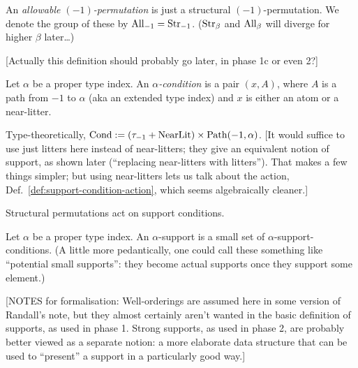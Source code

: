 \begin{definition}
  \label{def:allowable-perm-atoms}
  An \emph{allowable $(-1)$-permutation} is just a structural $(-1)$-permutation. We denote the group of these by $\mathrm{All}_{-1} = \mathrm{Str}_{-1}$.  ($\mathrm{Str}_\beta$ and $\mathrm{All}_\beta$ will diverge for higher $\beta$ later…)

  [Actually this definition should probably go later, in phase 1c or even 2?]
\end{definition}

\begin{definition}
  \label{def:support-condition}
  \leanok
  Let $\alpha$ be a proper type index. An \emph{$\alpha$-condition} is a pair $(x,A)$, where $A$ is a path from $-1$ to $\alpha$ (aka an extended type index) and $x$ is either an atom or a near-litter.

  Type-theoretically, $\mathrm{Cond} := (\tau_{-1} + \mathrm{NearLit}) \times \mathrm{Path}(-1,\alpha)$.
  [It would suffice to use just litters here instead of near-litters; they give an equivalent notion of support, as shown later (“replacing near-litters with litters”).  That makes a few things simpler; but using near-litters lets us talk about the action, Def.~\ref{def:support-condition-action}, which seems algebraically cleaner.]
\end{definition}

\begin{definition}
\label{def:support-condition-action}
\leanok
Structural permutations act on support conditions.
\end{definition}

\begin{definition}
\label{def:support}
\leanok
Let $\alpha$ be a proper type index. An $\alpha$-support is a small set of $\alpha$-support-conditions.  (A little more pedantically, one could call these something like “potential small supports”: they become actual supports once they support some element.)

[NOTES for formalisation: Well-orderings are assumed here in some version of Randall’s note, but they almost certainly aren’t wanted in the basic definition of supports, as used in phase 1. Strong supports, as used in phase 2, are probably better viewed as a separate notion: a more elaborate data structure that can be used to “present” a support in a particularly good way.]
\end{definition}

